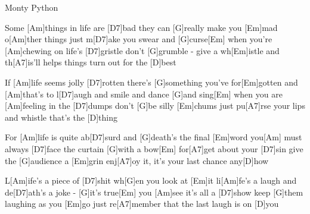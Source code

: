 {Monty Python}
{}
{
Some [Am]things in life are [D7]bad
they can [G]really make you [Em]mad
o[Am]ther things just m[D7]ake you swear and [G]curse[Em]
when you're [Am]chewing on life's [D7]gristle
don't [G]grumble - give a wh[Em]istle
and th[A7]is'll helps things turn out for the [D]best


If [Am]life seems jolly [D7]rotten
there's [G]something you've for[Em]gotten
and [Am]that's to l[D7]augh and smile and dance [G]and sing[Em]
when you are [Am]feeling in the [D7]dumps
don't [G]be silly [Em]chums
just pu[A7]rse your lips and whistle that's the [D]thing


For [Am]life is quite ab[D7]surd
and [G]death's the final [Em]word
you[Am] must always [D7]face the curtain [G]with a bow[Em]
for[A7]get about your [D7]sin
give the [G]audience a [Em]grin
enj[A7]oy it, it's your last chance any[D]how



L[Am]ife's a piece of [D7]shit
wh[G]en you look at [Em]it
li[Am]fe's a laugh and de[D7]ath's a joke - [G]it's true[Em]
you [Am]see it's all a [D7]show
keep [G]them laughing as you [Em]go
just re[A7]member that the last laugh is on [D]you


}